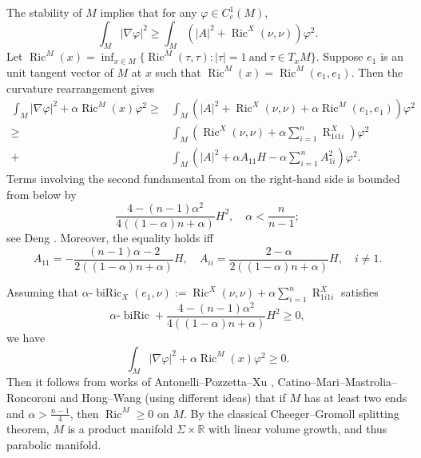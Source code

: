 \documentclass[11pt,letterpaper]{amsart}
\DeclareMathOperator{\Ric}{Ric}
\DeclareMathOperator{\biRic}{biRic}
\DeclareMathOperator{\R}{R}
\theoremstyle{definition}
\theoremstyle{remark}
\numberwithin{equation}{section}
\begin{document}
The stability of $M$ implies that for any $\varphi\in C_c^1(M)$,
\[\int_M |\nabla\varphi|^2\geq \int_M (|A|^2+\Ric^X(\nu,\nu))\varphi^2.\]
Let $\Ric^M(x)=\inf_{x\in M}\{\Ric^M(\tau,\tau): |\tau|=1\ \text{and}\ \tau\in T_xM\}$. Suppose $e_1$ is an unit tangent vector of $M$ at $x$ such that $\Ric^M(x)=\Ric^M(e_1,e_1)$. Then the curvature rearrangement gives
\begin{align*}
    \int_M |\nabla \varphi|^2+\alpha \Ric^M(x)\varphi^2\geq&\int_M (|A|^2+\Ric^X(\nu,\nu)+\alpha\Ric^M(e_1,e_1))\varphi^2\\
    \geq& \int_M (\Ric^X(\nu,\nu)+\alpha \sum_{i=1}^n \R^X_{1i1i})\varphi^2\\
    +& \int_M (|A|^2+\alpha A_{11}H-\alpha \sum_{i=1}^n A^2_{1i})\varphi^2.
\end{align*}
Terms involving the second fundamental from on the right-hand side is bounded from below by
\[\frac{4-(n-1)\alpha^2}{4((1-\alpha)n+\alpha)}H^2, \quad \alpha<\frac{n}{n-1};\]
see Deng \cite[Lemma 2.1]{dengqintao}. Moreover, the equality holds iff 
\begin{equation*}
    A_{11}=-\frac{(n-1)\alpha-2}{2((1-\alpha)n+\alpha)}H,\quad A_{ii}=\frac{2-\alpha}{2((1-\alpha)n+\alpha)}H, \quad i\neq 1.
\end{equation*}

Assuming that $\alpha\text{-}\biRic_X(e_1,\nu):=\Ric^X(\nu,\nu)+\alpha \sum_{i=1}^n \R^X_{1i1i}$ satisfies
\[\alpha\text{-}\biRic+\frac{4-(n-1)\alpha^2}{4((1-\alpha)n+\alpha)}H^2\geq 0,\]
 we have
\[\int_M |\nabla \varphi|^2+\alpha \Ric^M(x)\varphi^2\geq 0.\]
Then it follows from works of Antonelli--Pozzetta--Xu \cite{antonelli-pozzetta-xu}, Catino--Mari--Mastrolia--Roncoroni \cite{catino-Mari-Mastrolia-Roncoroni} and Hong--Wang \cite{hong-wang-spectral-splitting} (using different ideas) that if $M$ has at least two ends and $\alpha>\frac{n-1}{4}$, then $\Ric^M\geq 0$ on $M.$ By the classical Cheeger--Gromoll splitting theorem, $M$ is a product manifold $\Sigma\times \mathbb{R}$ with linear volume growth, and thus parabolic manifold. 

\end{document}
